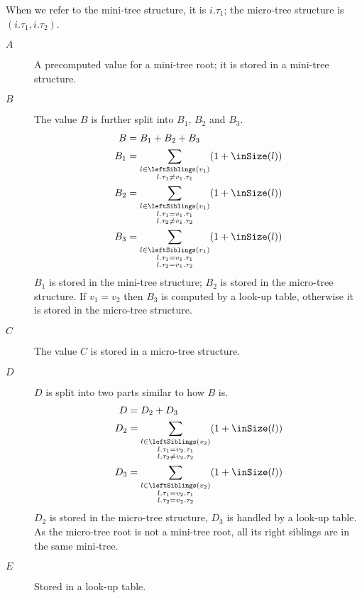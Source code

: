 When we refer to the mini-tree structure, it is $i.\tau_1$; the micro-tree structure is $(i.\tau_1, i.\tau_2)$.
\begin{description}
	\item[$A$]
	A precomputed value for a mini-tree root; it is stored in a mini-tree structure.
	
	\item[$B$]
	The value $B$ is further split into $B_1$, $B_2$ and $B_3$.
	\begin{align*}
		B &= B_1 + B_2 + B_3\\
		B_1 &= \sum_{\substack{l \in \leftSiblings(v_1) \\ l.\tau_1 \ne v_1.\tau_1}} (1 + \inSize(l)) \\
		B_2 &= \sum_{\substack{l \in \leftSiblings(v_1) \\ l.\tau_1 = v_1.\tau_1 \\ l.\tau_2 \ne v_1.\tau_2}} (1 + \inSize(l)) \\
		B_3 &= \sum_{\substack{l \in \leftSiblings(v_1) \\ l.\tau_1 = v_1.\tau_1 \\ l.\tau_2 = v_1.\tau_2}} (1 + \inSize(l))
	\end{align*}
	$B_1$ is stored in the mini-tree structure; $B_2$ is stored in the micro-tree structure.
	If $v_1 = v_2$ then $B_3$ is computed by a look-up table, otherwise it is stored in the micro-tree structure.
	
	\item[$C$]
	The value $C$ is stored in a micro-tree structure.
	
	\item[$D$]
	$D$ is split into two parts similar to how $B$ is.
	\begin{align*}
		D &= D_2 + D_3\\
		D_2 &= \sum_{\substack{l \in \leftSiblings(v_2) \\ l.\tau_1 = v_2.\tau_1 \\ l.\tau_2 \ne v_2.\tau_2}} (1 + \inSize(l)) \\
		D_3 &= \sum_{\substack{l \in \leftSiblings(v_2) \\ l.\tau_1 = v_2.\tau_1 \\ l.\tau_2 = v_2.\tau_2}} (1 + \inSize(l))
	\end{align*}
	$D_2$ is stored in the micro-tree structure, $D_3$ is handled by a look-up table.
	As the micro-tree root is not a mini-tree root, all its right siblings are in the same mini-tree.
	
	\item[$E$]
	Stored in a look-up table.
\end{description}

